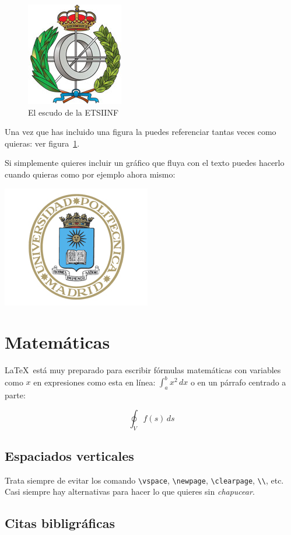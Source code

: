 \begin{figure}[h]
  \centering
  \includegraphics[width=0.33\linewidth]{portada/escudo_etsiinf}
  \caption{El escudo de la ETSIINF}
  \label{fig:escudo}
\end{figure}

Una vez que has incluido una figura la puedes referenciar tantas veces como quieras: ver figura~\ref{fig:escudo}.

Si simplemente quieres incluir un gráfico que fluya con el texto puedes hacerlo cuando quieras como por ejemplo ahora mismo:
\begin{center}
  \includegraphics[width=0.15\linewidth]{portada/escudo_upm}
\end{center}

\section{Matemáticas}

\LaTeX\ está muy preparado para escribir fórmulas matemáticas con variables como $x$ en expresiones como esta en línea: \(\int_{a}^{b} x^2 \,dx\) o en un párrafo centrado a parte:

\begin{displaymath}
  \oint_V f(s) \,ds
\end{displaymath}

\subsection{Espaciados verticales}

Trata siempre de evitar los comando \verb|\vspace|, \verb|\newpage|, \verb|\clearpage|, \verb|\\|, etc. Casi siempre hay alternativas para hacer lo que quieres sin \emph{chapucear}.

\subsection{Citas bibligráficas}

